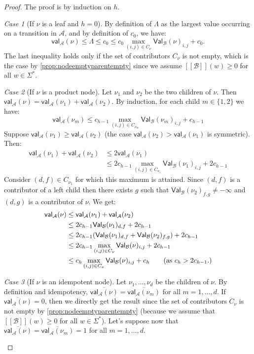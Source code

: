 \documentclass[10pt,a4paper]{amsart}
\theoremstyle{definition}
\numberwithin{equation}{section}
\theoremstyle{remark}
\newtheorem{case}{Case}
\newcommand{\autA}{\mathcal{A}}
\newcommand{\autB}{\mathcal{B}}
\newcommand{\brfunc}[1]{[\![#1]\!]}
\newcommand{\funcB}{\brfunc{\autB}}
\newcommand{\aval}{\mathsf{val}_\autA}
\newcommand{\bval}{\mathsf{Val}_\autB}
\theoremstyle{remark}
\begin{document}
\begin{proof}
The proof is by induction on $h$.
\begin{case}[If $\nu$ is a leaf and $h=0$]
By definition of $\Lambda$ as the largest value occurring on a transition in $\autA$, and by definition of $c_0$, we have:
 \[\aval(\nu) \le \Lambda \le c_0 \le c_0 \max_{(i,j) \in C_\nu} \bval(\nu)_{i,j} + c_0.\] 
The last inequality holds only if the set of contributors $C_\nu$ is not empty, which is the case by \cref{prop:nodeemptyparentempty} since we assume $\funcB(w) \ge 0$ for all $w\in \Sigma^*$.
\end{case}

\begin{case}[If $\nu$ is a product node]
Let $\nu_1$ and $\nu_2$ be the two children of $\nu$. Then $\aval(\nu) = \aval(\nu_1) + \aval(\nu_2)$. By induction, for each child $m\in\{1,2\}$ we have:
\[ \aval(\nu_m) \leq c_{h-1} \max_{(i,j) \in C_{\nu_m}} \bval(\nu_m)_{i,j} + c_{h-1}\]
Suppose $\aval(\nu_1) \geq  \aval(\nu_2)$ (the case $\aval(\nu_2) >  \aval(\nu_1)$ is symmetric). Then:
\begin{align*}
\aval(\nu_1)+\aval(\nu_2) & \le 2\aval(\nu_1) \\
& \le 2c_{h-1} \max_{(i,j) \in C_{\nu_1}} \bval(\nu_1)_{i,j} + 2c_{h-1}
\end{align*}
Consider $(d,f) \in C_{\nu_1}$ for which this maximum is attained. Since $(d,f)$ is a contributor of a left child then there exists $g$ such that $\bval(\nu_2)_{f,g} \neq -\infty$ and $(d,g)$ is a contributor of $\nu$.
We get:
\begin{align*}
\aval(\nu) &\le \aval(\nu_1) + \aval(\nu_2)
\\&\le 2c_{h-1} \bval(\nu_1)_{d,f} + 2c_{h-1}
\\&\le 2c_{h-1} (\bval(\nu_1)_{d,f} + \bval(\nu_2)_{f,g}) + 2c_{h-1}
\\&\le 2c_{h-1}  \max_{(i,j) \in C_{\nu}} \bval(\nu)_{i,j} + 2c_{h-1}
\\&\le c_h  \max_{(i,j) \in C_{\nu}} \bval(\nu)_{i,j} + c_{h} \tag{as $c_h > 2c_{h-1}$.}
\end{align*}
\end{case}

\begin{case}[If $\nu$ is an idempotent node]
Let $\nu_1,\dots,\nu_d$ be the children of $\nu$. 
By definition and idempotency, $\overline{\aval(\nu)} = \overline{\aval(\nu_m)}$ for all $m=1,\ldots,d$. If $\overline{\aval(\nu)} = 0$, then we directly get the result since the set of contributors $C_\nu$ is not empty by \cref{prop:nodeemptyparentempty} (because we assume that $\funcB(w) \ge 0$ for all $w\in \Sigma^*$). Let's suppose now that $\overline{\aval(\nu)} = \overline{\aval(\nu_m)} = 1$ for all $m=1,\ldots,d$.


\end{case}
\end{proof}
\end{document}
